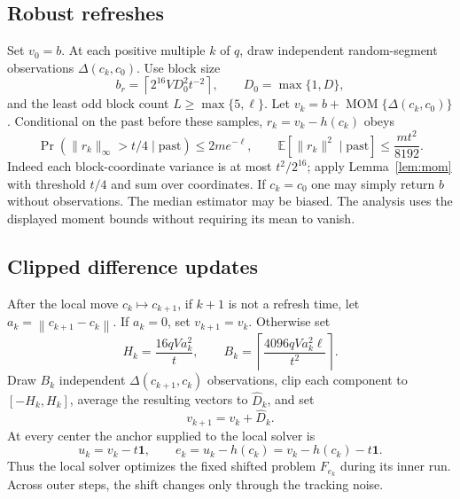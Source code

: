 \documentclass[11pt,a4paper]{article}
\newcommand{\E}{\mathbb E}
\newcommand{\norm}[1]{\left\lVert#1\right\rVert}
\theoremstyle{remark}
\numberwithin{equation}{section}
\begin{document}
\subsection{Robust refreshes}
Set $v_0=b$. At each positive multiple $k$ of $q$, draw independent random-segment observations $\Delta(c_k,c_0)$. Use block size
\[
 b_r=\left\lceil2^{16}V D_0^2t^{-2}\right\rceil,\qquad D_0=\max\{1,D\},
\]
and the least odd block count $L\ge\max\{5,\ell\}$. Let $v_k=b+\operatorname{MOM}\{\Delta(c_k,c_0)\}$. Conditional on the past before these samples, $r_k=v_k-h(c_k)$ obeys
\begin{equation}
 \Pr(\|r_k\|_\infty>t/4\mid\text{past})\le2m e^{-\ell},\qquad
 \E[\|r_k\|^2\mid\text{past}]\le\frac{m t^2}{8192}.
 \label{eq:refresh}
\end{equation}
Indeed each block-coordinate variance is at most $t^2/2^{16}$; apply Lemma~\ref{lem:mom} with threshold $t/4$ and sum over coordinates. If $c_k=c_0$ one may simply return $b$ without observations. The median estimator may be biased. The analysis uses the displayed moment bounds without requiring its mean to vanish.

\subsection{Clipped difference updates}
After the local move $c_k\mapsto c_{k+1}$, if $k+1$ is not a refresh time, let $a_k=\norm{c_{k+1}-c_k}$. If $a_k=0$, set $v_{k+1}=v_k$. Otherwise set
\begin{equation}
 H_k=\frac{16qV a_k^2}{t},\qquad
 B_k=\left\lceil\frac{4096qV a_k^2\ell}{t^2}\right\rceil.
 \label{eq:clipbatch}
\end{equation}
Draw $B_k$ independent $\Delta(c_{k+1},c_k)$ observations, clip each component to $[-H_k,H_k]$, average the resulting vectors to $\widehat D_k$, and set
\[
 v_{k+1}=v_k+\widehat D_k.
\]
At every center the anchor supplied to the local solver is
\begin{equation}
 u_k=v_k-t\mathbf1,
 \qquad e_k=u_k-h(c_k)=v_k-h(c_k)-t\mathbf1.
 \label{eq:shifttracker}
\end{equation}
Thus the local solver optimizes the fixed shifted problem $F_{e_k}$ during its inner run. Across outer steps, the shift changes only through the tracking noise.
\end{document}
